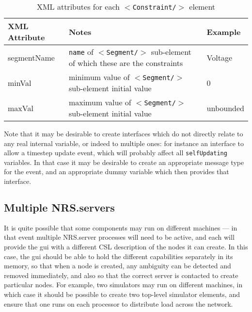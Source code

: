 \documentclass[pdftex,a4paper]{article}
\newcommand{\XML}[2][]{{\tt \small $<$#2#1/$>$}}
\newcommand{\XMLfont}[1]{{\tt \small #1}}
\begin{document}
\begin{table}[!h]
  \begin{center}
    \caption{XML attributes for each \XML{Constraint} element}
    \label{tab:constraints}
    \begin{tabular}{|l|p{6cm}|l|}
      \hline

      \textbf{XML Attribute} & \textbf{Notes} & \textbf{Example}\\

      \hline

      segmentName & \XMLfont{name} of \XML{Segment} sub-element of which
      these are the constraints & Voltage\\

      \hline

      minVal & minimum value of \XML{Segment} sub-element initial
      value & 0\\

      \hline

      maxVal & maximum value of \XML{Segment} sub-element initial
      value & unbounded\\

      \hline
    \end{tabular}
  \end{center}
\end{table}


Note that it may be desirable to create interfaces which do not
directly relate to any real internal variable, or indeed to multiple
ones: for instance an interface to allow a timestep update event,
which will probably affect all \XMLfont{selfUpdating} variables. In
that case it may be desirable to create an appropriate message type
for the event, and an appropriate dummy variable which then provides
that interface.

\subsection{Multiple NRS.servers}

It is quite possible that some components may run on different
machines --- in that event multiple NRS.server processes will need to
be active, and each will provide the gui with a different CSL
description of the nodes it can create. In this case, the gui should
be able to hold the different capabilities separately in its memory,
so that when a node is created, any ambiguity can be detected and
removed immediately, and also so that the correct server is contacted
to create particular nodes. For example, two simulators may run on
different machines, in which case it should be possible to create two
top-level simulator elements, and ensure that one runs on each
processor to distribute load across the network.
\end{document}
